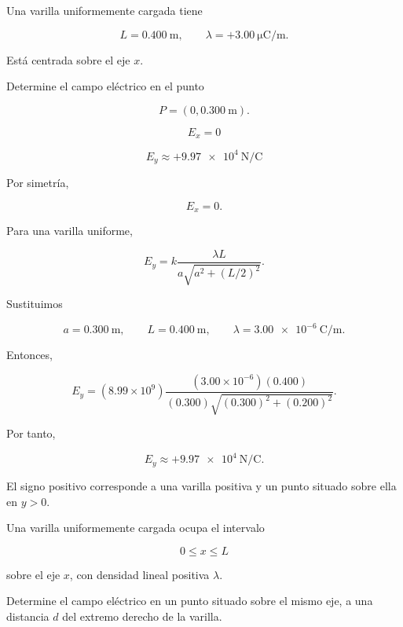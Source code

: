 \begin{ejercicio}

Una varilla uniformemente cargada tiene

\[
L=\SI{0.400}{\metre},
\qquad
\lambda=+\SI{3.00}{\micro\coulomb\per\metre}.
\]

Está centrada sobre el eje \(x\).

Determine el campo eléctrico en el punto

\[
P=(0,\SI{0.300}{\metre}).
\]

\end{ejercicio}

\begin{respuesta}

\[
\boxed{E_x=0}
\]

\[
\boxed{E_y\approx+\SI{9.97e4}{\newton\per\coulomb}}
\]

\end{respuesta}

\begin{explicacion}

Por simetría,

\[
E_x=0.
\]

Para una varilla uniforme,

\[
E_y=
k\frac{\lambda L}
{a\sqrt{a^2+(L/2)^2}}.
\]

Sustituimos

\[
a=\SI{0.300}{\metre},
\qquad
L=\SI{0.400}{\metre},
\qquad
\lambda=\SI{3.00e-6}{\coulomb\per\metre}.
\]

Entonces,

\[
E_y=
(8.99\times10^9)
\frac{(3.00\times10^{-6})(0.400)}
{(0.300)\sqrt{(0.300)^2+(0.200)^2}}.
\]

Por tanto,

\[
\boxed{E_y\approx+\SI{9.97e4}{\newton\per\coulomb}}.
\]

El signo positivo corresponde a una varilla positiva y un punto situado sobre ella en \(y>0\).

\end{explicacion}


\begin{ejercicio}

Una varilla uniformemente cargada ocupa el intervalo

\[
0\leq x\leq L
\]

sobre el eje \(x\), con densidad lineal positiva \(\lambda\).

Determine el campo eléctrico en un punto situado sobre el mismo eje, a una distancia \(d\) del extremo derecho de la varilla.

\end{ejercicio}

